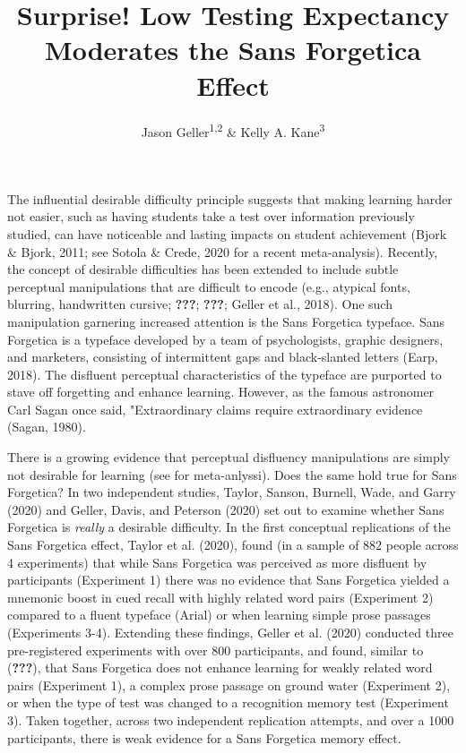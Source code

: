 \documentclass[
  english,
  man]{apa6}
\title{Surprise! Low Testing Expectancy Moderates the Sans Forgetica Effect}
\author{Jason Geller\textsuperscript{1,2} \& Kelly A. Kane\textsuperscript{3}}
\date{}
\affiliation{\vspace{0.5cm}\textsuperscript{1} University of Iowa\\\textsuperscript{2} Rutgers University Center for Cognitive Science\\\textsuperscript{3} Glenville State College}
\begin{document}
\maketitle

The influential desirable difficulty principle suggests that making learning harder not easier, such as having students take a test over information previously studied, can have noticeable and lasting impacts on student achievement (Bjork \& Bjork, 2011; see Sotola \& Crede, 2020 for a recent meta-analysis). Recently, the concept of desirable difficulties has been extended to include subtle perceptual manipulations that are difficult to encode (e.g., atypical fonts, blurring, handwritten cursive; {\textbf{???}}; {\textbf{???}}; Geller et al., 2018). One such manipulation garnering increased attention is the Sans Forgetica typeface. Sans Forgetica is a typeface developed by a team of psychologists, graphic designers, and marketers, consisting of intermittent gaps and black-slanted letters (Earp, 2018). The disfluent perceptual characteristics of the typeface are purported to stave off forgetting and enhance learning. However, as the famous astronomer Carl Sagan once said, "Extraordinary claims require extraordinary evidence (Sagan, 1980).

There is a growing evidence that perceptual disfluency manipulations are simply not desirable for learning (see for meta-anlyssi). Does the same hold true for Sans Forgetica? In two independent studies, Taylor, Sanson, Burnell, Wade, and Garry (2020) and Geller, Davis, and Peterson (2020) set out to examine whether Sans Forgetica is \emph{really} a desirable difficulty. In the first conceptual replications of the Sans Forgetica effect, Taylor et al. (2020), found (in a sample of 882 people across 4 experiments) that while Sans Forgetica was perceived as more disfluent by participants (Experiment 1) there was no evidence that Sans Forgetica yielded a mnemonic boost in cued recall with highly related word pairs (Experiment 2) compared to a fluent typeface (Arial) or when learning simple prose passages (Experiments 3-4). Extending these findings, Geller et al. (2020) conducted three pre-registered experiments with over 800 participants, and found, similar to ({\textbf{???}}), that Sans Forgetica does not enhance learning for weakly related word pairs (Experiment 1), a complex prose passage on ground water (Experiment 2), or when the type of test was changed to a recognition memory test (Experiment 3). Taken together, across two independent replication attempts, and over a 1000 participants, there is weak evidence for a Sans Forgetica memory effect.
\end{document}
